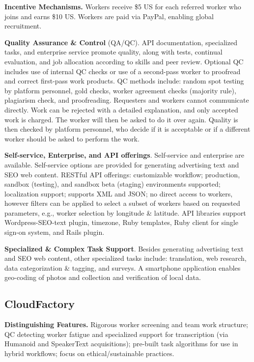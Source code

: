 \documentclass{sigchi}
\begin{document}
{\bf Incentive Mechanisms.} 
Workers  
receive \$5 US for each referred worker who joins and earns \$10 US. Workers are paid via PayPal, enabling global recruitment.

{\bf Quality Assurance \& Control} (QA/QC). API documentation, specialized tasks, and enterprise service promote quality, along with tests, continual evaluation, and job allocation according to skills and peer review. Optional QC includes  use of internal QC checks or use of a second-pass worker to proofread and correct first-pass work products. QC methods include: random spot testing by platform personnel, gold checks, worker agreement checks (majority rule), plagiarism check, 
and proofreading. Requesters and workers cannot communicate directly. Work can be rejected with a detailed explanation, and only accepted work is charged. The worker will then be asked to do it over again. Quality is then checked by platform personnel, who decide if it is acceptable or if a different worker should be asked to perform the work. 




{\bf Self-service, Enterprise, and API offerings}. Self-service and enterprise are available. Self-service options are provided for generating advertising text and SEO web content. RESTful API offerings: customizable workflow; production, sandbox (testing), and sandbox beta (staging) environments supported; localization support; supports XML and JSON; no direct access to workers, however filters can be applied to select a subset of workers based on requested parameters, e.g., worker selection by longitude \& latitude. API libraries support Wordpress-SEO-text plugin, timezone, Ruby templates, Ruby client for single sign-on system, and Rails plugin. 

{\bf Specialized \& Complex Task Support}. Besides generating advertising text and SEO web content, other specialized tasks include: translation, web research, data categorization \& tagging, and surveys. 
A smartphone application enables geo-coding of photos and collection and verification of local data. 




\subsection{CloudFactory}

{\bf Distinguishing Features.} Rigorous worker screening and team work structure; QC detecting worker fatigue and specialized support for transcription (via Humanoid and SpeakerText acquisitions); pre-built task algorithms for use in hybrid workflows; focus on ethical/sustainable practices.
\end{document}
